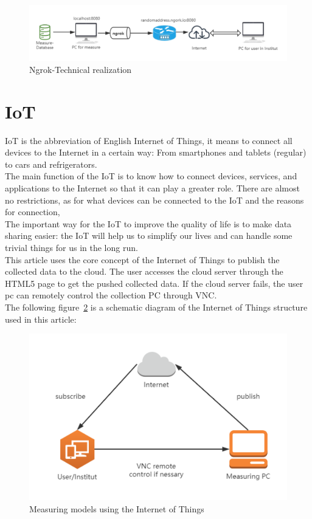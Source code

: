 \begin{figure}[!ht]
	\centering
	\includegraphics[width=13cm]{grafiken/2.15.pdf}
	\caption{Ngrok-Technical realization} 
	\label{fig:2.15}
\end{figure}
\FloatBarrier

\section{IoT}
\label{sec:IoT}
IoT is the abbreviation of English Internet of Things, it means to connect all devices to the Internet in a certain way: From smartphones and tablets (regular) to cars and refrigerators.\\
The main function of the IoT is to know how to connect devices, services, and applications to the Internet so that it can play a greater role. There are almost no restrictions, as for what devices can be connected to the IoT and the reasons for connection, \\
The important way for the IoT to improve the quality of life is to make data sharing easier: the IoT will help us to simplify our lives and can handle some trivial things for us in the long run.\\
This article uses the core concept of the Internet of Things to publish the collected data to the cloud. The user accesses the cloud server through the HTML5 page to get the pushed collected data. If the cloud server fails, the user pc can remotely control the collection PC through VNC.\\
The following figure~\ref{fig:2.16} is a schematic diagram of the Internet of Things structure used in this article:
\begin{figure}[!ht]
	\centering
	\includegraphics[width=13cm]{grafiken/2.16.pdf}
	\caption{Measuring models using the Internet of Things} 
	\label{fig:2.16}
\end{figure}
\FloatBarrier

